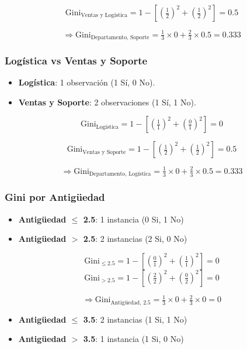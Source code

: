 \documentclass[12pt]{article}
\begin{document}
\[
  \mathrm{Gini}_{\text{Ventas y Logística}} = 1 - \left[\left(\tfrac{1}{2}\right)^2 + \left(\tfrac{1}{2}\right)^2\right] = 0.5
\]

\[
  \Rightarrow \mathrm{Gini}_{\text{Departamento, Soporte}} = \tfrac{1}{3}\times0 + \tfrac{2}{3}\times0.5 = 0.333
\]

\subsubsection{Logística vs Ventas y Soporte}

\begin{itemize}
  \item \textbf{Logística}: 1 observación (1 Sí, 0 No).
  \item \textbf{Ventas y Soporte}: 2 observaciones (1 Sí, 1 No).
\end{itemize}

\[
  \mathrm{Gini}_{\text{Logística}} = 1 - \left[\left(\tfrac{1}{1}\right)^2 + \left(\tfrac{0}{1}\right)^2\right] = 0
\]

\[
  \mathrm{Gini}_{\text{Ventas y Soporte}} = 1 - \left[\left(\tfrac{1}{2}\right)^2 + \left(\tfrac{1}{2}\right)^2\right] = 0.5
\]

\[
  \Rightarrow \mathrm{Gini}_{\text{Departamento, Logística}} = \tfrac{1}{3}\times0 + \tfrac{2}{3}\times0.5 = 0.333
\]

\subsubsection{Gini por Antigüedad}

\begin{itemize}
  \item \textbf{Antigüedad $\leq$ 2.5}: 1 instancia (0 Si, 1 No)
  \item \textbf{Antigüedad $>$ 2.5}: 2 instancias (2 Si, 0 No)
\end{itemize}

\[
  \mathrm{Gini}_{\le2.5} = 1 - \left[\left(\tfrac{0}{1}\right)^2 + \left(\tfrac{1}{1}\right)^2\right] = 0
\]
\[
  \mathrm{Gini}_{>2.5} = 1 - \left[\left(\tfrac{2}{2}\right)^2 + \left(\tfrac{0}{2}\right)^2\right] = 0
\]

\[
  \Rightarrow \mathrm{Gini}_{\text{Antigüedad, 2.5}} = \tfrac{1}{3}\times0 + \tfrac{2}{3}\times0 = 0
\]

\begin{itemize}
  \item \textbf{Antigüedad $\leq$ 3.5}: 2 instancias (1 Si, 1 No)
  \item \textbf{Antigüedad $>$ 3.5}: 1 instancia (1 Si, 0 No)
\end{itemize}
\end{document}
